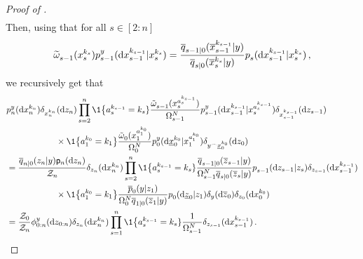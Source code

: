 \begin{proof}[Proof of ]
\begin{align*}
    \end{align*}
        Then, using that for all $s \in [2:n]$
    \[
        \uweight{}{s-1}(\iparticle{k_s}{s}) \bwopt{s-1}{y}{\iparticle{k_s}{s}}{\rmd \iparticle{k_{s-1}}{s-1}} = \frac{\tfwtrans{s-1|0}{\lmeas}{\ltopstate^{k_{s-1}} _{s-1}}}{\tfwtrans{s|0}{\lmeas}{\ltopstate^{k_s} _{s}}} \bwtrans{}{s}{\iparticle{k_s}{s}}{\rmd \iparticle{k_{s-1}}{s-1}} \eqsp,
    \]
     we recursively get that 
     \begin{align*}
         & \bwopt{n}{y}{}{}(\rmd \iparticle{k_n}{n}) \delta_{\iparticle{k_n}{n}}(\rmd z_n) \prod_{s = 2}^{n}\1 \big\{ \ianc{k_{s-1}}{s} = k_s\} \wratio{}{s-1}{\iparticle{\ianc{k_{s-1}}{s}}{s}} \bwopt{s-1}{y}{\iparticle{\ianc{k_{s-1}}{s}}{s}}{\rmd \iparticle{k_{s-1}}{s-1}} \delta_{\iparticle{k_{s-1}}{s-1}}(\rmd z_{s-1})\\
         & \hspace{2cm}  \times \1 \big\{ \ianc{k_0}{1} = k_1 \big\} \wratio{}{0}{\iparticle{\ianc{k_{0}}{1}}{1}} \bwopt{0}{y}{\iparticle{\ianc{k_{0}}{1}}{1}}{\rmd \lbottomstate^{k_0} _0} \delta_{\cat{\lmeas}{\lbottomstate^{k_0} _0}}(\rmd z_{0}) \\
         & = \frac{\tfwtrans{n|0}{\lmeas}{z_n} \bwmarg{n}{\rmd z_n}}{\normconst_n} \delta_{z_n}(\rmd \iparticle{k_n}{n}) \prod_{s=2}^{n} \1 \big\{ \ianc{k_{s-1}}{s} = k_s\} \frac{\tfwtrans{s-1|0}{\lmeas}{\overline{z}_{s-1}}}{\sumweight{s-1} \tfwtrans{s|0}{\lmeas}{\overline{z}_s}} \bwtrans{}{s-1}{z_s}{\rmd z_{s-1}} \delta_{z_{s-1}}(\rmd \iparticle{k_{s-1}}{s-1}) \\
         & \hspace{2cm} \times \1 \big\{ \ianc{k_0}{1} = k_1 \big\} \frac{\tbwtrans{}{0}{z_1}{\lmeas}}{\sumweight{0} \tfwtrans{1|0}{\lmeas}{\overline{z}_1}} \bwtrans{}{0}{z_1}{\rmd \underline{z}_0} \delta_\lmeas (\rmd \overline{z}_0) \delta_{z_0}(\rmd \lstate^{k_0} _{0}) \\
         & = \frac{\normconst_0}{\normconst_n} \filter{0:n}{y}{\rmd z_{0:n}}  \delta_{z_n}(\rmd \iparticle{k_n}{n}) \prod_{s=1}^{n} \1 \big\{ \ianc{k_{s-1}}{s} = k_s\} \frac{1}{\sumweight{s-1}} \delta_{z_{s-1}}(\rmd \iparticle{k_{s-1}}{s-1}) \eqsp.

\end{align*}
\end{proof}
